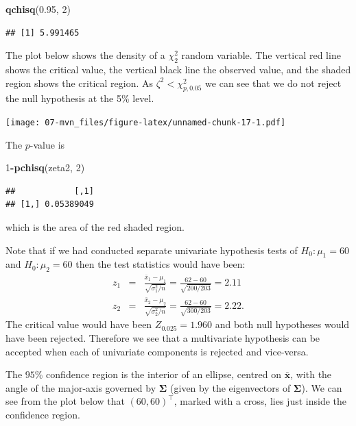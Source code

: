 \documentclass[
]{book}
\newenvironment{Shaded}{\begin{snugshade}}{\end{snugshade}}
\newcommand{\DecValTok}[1]{\textcolor[rgb]{0.00,0.00,0.81}{#1}}
\newcommand{\FloatTok}[1]{\textcolor[rgb]{0.00,0.00,0.81}{#1}}
\newcommand{\FunctionTok}[1]{\textcolor[rgb]{0.13,0.29,0.53}{\textbf{#1}}}
\newcommand{\NormalTok}[1]{#1}
\newcommand{\SpecialCharTok}[1]{\textcolor[rgb]{0.81,0.36,0.00}{\textbf{#1}}}
\theoremstyle{definition}
\theoremstyle{definition}
\theoremstyle{definition}
\theoremstyle{definition}
\theoremstyle{remark}
\begin{document}
\begin{Shaded}
\begin{Highlighting}[]
\FunctionTok{qchisq}\NormalTok{(}\FloatTok{0.95}\NormalTok{, }\DecValTok{2}\NormalTok{)}
\end{Highlighting}
\end{Shaded}

\begin{verbatim}
## [1] 5.991465
\end{verbatim}

The plot below shows the density of a \(\chi^2_2\) random variable. The vertical red line shows the critical value, the vertical black line the observed value, and the shaded region shows the critical region. As \(\zeta^2 < \chi^2_{p,0.05}\) we can see that we do not reject the null hypothesis at the 5\% level.

\texttt{[image: 07-mvn\_files/figure-latex/unnamed-chunk-17-1.pdf]}

The \(p\)-value is

\begin{Shaded}
\begin{Highlighting}[]
\DecValTok{1}\SpecialCharTok{{-}}\FunctionTok{pchisq}\NormalTok{(zeta2, }\DecValTok{2}\NormalTok{)}
\end{Highlighting}
\end{Shaded}

\begin{verbatim}
##            [,1]
## [1,] 0.05389049
\end{verbatim}

which is the area of the red shaded region.

Note that if we had conducted separate univariate hypothesis tests of \(H_0: \mu_1 = 60\) and \(H_0: \mu_2 = 60\) then the test statistics would have been:
\begin{eqnarray*}
z_1 &=& \frac{\bar{x}_1 - \mu_1}{\sqrt{\sigma_1^2/n}} = \frac{62-60}{\sqrt{200/203}} = 2.11  \\
z_2 &=& \frac{\bar{x}_2 - \mu_2}{\sqrt{\sigma_2^2/n}} = \frac{62-60}{\sqrt{300/203}} = 2.22.
\end{eqnarray*}
The critical value would have been \(Z_{0.025} = 1.960\) and both null hypotheses would have been rejected. Therefore we see that a multivariate hypothesis can be accepted when each of univariate components is rejected and vice-versa.

The \(95\)\% confidence region is the interior of an ellipse, centred on \(\bar{\mathbf x}\), with the angle of the major-axis governed by \(\boldsymbol{\Sigma}\) (given by the eigenvectors of \(\boldsymbol{\Sigma}\)). We can see from the plot below that \((60,60)^\top\), marked with a cross, lies just inside the confidence region.
\end{document}
